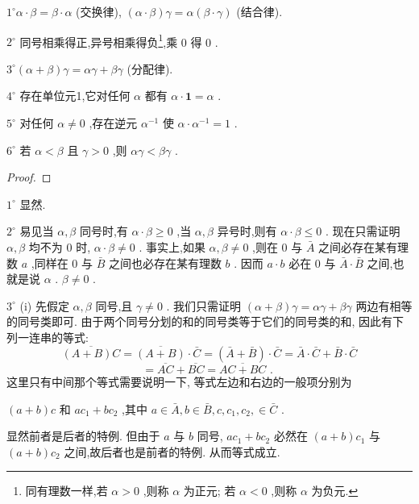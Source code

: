\({1}^{ \circ  }\alpha  \cdot  \beta  = \beta  \cdot  \alpha\) (交换律), \(\left( {\alpha  \cdot  \beta }\right) \gamma  = \alpha \left( {\beta  \cdot  \gamma }\right)\) (结合律).

\({2}^{ \circ  }\) 同号相乘得正,异号相乘得负\footnote{同有理数一样,若 \(\alpha  > 0\) ,则称 \(\alpha\) 为正元; 若 \(\alpha  < 0\) ,则称 \(\alpha\) 为负元.},乘 0 得 0 .

\({3}^{ \circ  }\left( {\alpha  + \beta }\right) \gamma  = {\alpha \gamma } + {\beta \gamma }\) (分配律).

\({4}^{ \circ  }\) 存在单位元1,它对任何 \(\alpha\) 都有 \(\alpha  \cdot  \mathbf{1} = \alpha\) .

\({5}^{ \circ  }\) 对任何 \(\alpha  \neq  0\) ,存在逆元 \({\alpha }^{-1}\) 使 \(\alpha  \cdot  {\alpha }^{-1} = 1\) .

\({6}^{ \circ  }\) 若 \(\alpha  < \beta\) 且 \(\gamma  > 0\) ,则 \({\alpha \gamma } < {\beta \gamma }\) .

\begin{proof}

\end{proof}
\({1}^{ \circ  }\) 显然.

\({2}^{ \circ  }\) 易见当 \(\alpha ,\beta\) 同号时,有 \(\alpha  \cdot  \beta  \geq  0\) ,当 \(\alpha ,\beta\) 异号时,则有 \(\alpha  \cdot  \beta  \leq  0\) . 现在只需证明 \(\alpha ,\beta\) 均不为 0 时, \(\alpha  \cdot  \beta  \neq  0\) . 事实上,如果 \(\alpha ,\beta  \neq  0\) ,则在 0 与 \(\bar{A}\) 之间必存在某有理数 \(a\) ,同样在 0 与 \(\bar{B}\) 之间也必存在某有理数 \(b\) . 因而 \(a \cdot  b\) 必在 0 与 \(\bar{A} \cdot  \bar{B}\) 之间,也就是说 \(\alpha\) . \(\beta  \neq  0\) .

\({3}^{ \circ  }\) (i) 先假定 \(\alpha ,\beta\) 同号,且 \(\gamma  \neq  0\) . 我们只需证明 \(\left( {\alpha  + \beta }\right) \gamma  = {\alpha \gamma } + {\beta \gamma }\) 两边有相等的同号类即可. 由于两个同号分划的和的同号类等于它们的同号类的和, 因此有下列一连串的等式:
\[
\overline{\left( {A + B}\right) C} = \overline{\left( A + B\right) } \cdot  \bar{C} = \left( {\bar{A} + \bar{B}}\right)  \cdot  \bar{C} = \bar{A} \cdot  \bar{C} + \bar{B} \cdot  \bar{C}
\]
\[
= \overline{AC} + \overline{BC} = \overline{{AC} + {BC}}\text{ . }
\]
这里只有中间那个等式需要说明一下, 等式左边和右边的一般项分别为

\(\left( {a + b}\right) c\) 和 \(a{c}_{1} + b{c}_{2}\) ,其中 \(a \in  \bar{A},b \in  \bar{B},c,{c}_{1},{c}_{2}, \in  \bar{C}\) .

显然前者是后者的特例. 但由于 \(a\) 与 \(b\) 同号, \(a{c}_{1} + b{c}_{2}\) 必然在 \(\left( {a + b}\right) {c}_{1}\) 与 \(\left( {a + b}\right) {c}_{2}\) 之间,故后者也是前者的特例. 从而等式成立.

